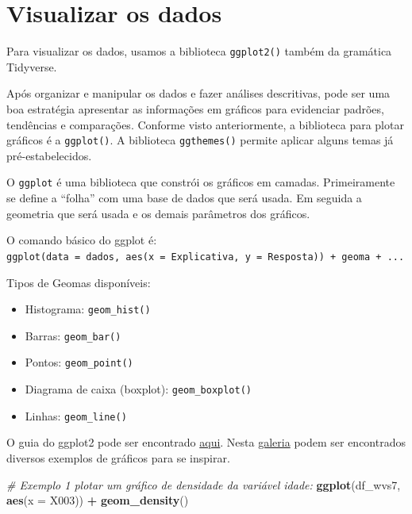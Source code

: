 \documentclass[
  brazil,
]{book}
\newenvironment{Shaded}{\begin{snugshade}}{\end{snugshade}}
\newcommand{\CommentTok}[1]{\textcolor[rgb]{0.56,0.35,0.01}{\textit{#1}}}
\newcommand{\DataTypeTok}[1]{\textcolor[rgb]{0.13,0.29,0.53}{#1}}
\newcommand{\KeywordTok}[1]{\textcolor[rgb]{0.13,0.29,0.53}{\textbf{#1}}}
\newcommand{\NormalTok}[1]{#1}
\newcommand{\OperatorTok}[1]{\textcolor[rgb]{0.81,0.36,0.00}{\textbf{#1}}}
\newcommand{\StringTok}[1]{\textcolor[rgb]{0.31,0.60,0.02}{#1}}
\providecommand{\tightlist}{%
  \setlength{\itemsep}{0pt}\setlength{\parskip}{0pt}}
\begin{document}
\hypertarget{visualizar-os-dados}{%
\chapter{Visualizar os dados}\label{visualizar-os-dados}}

Para visualizar os dados, usamos a biblioteca \texttt{ggplot2()} também da gramática Tidyverse.

Após organizar e manipular os dados e fazer análises descritivas, pode ser uma boa estratégia apresentar as informações em gráficos para evidenciar padrões, tendências e comparações. Conforme visto anteriormente, a biblioteca para plotar gráficos é a \texttt{ggplot()}. A biblioteca \texttt{ggthemes()} permite aplicar alguns temas já pré-estabelecidos.

O \texttt{ggplot} é uma biblioteca que constrói os gráficos em camadas. Primeiramente se define a ``folha'' com uma base de dados que será usada. Em seguida a geometria que será usada e os demais parâmetros dos gráficos.

O comando básico do ggplot é: \texttt{ggplot(data\ =\ dados,\ aes(x\ =\ Explicativa,\ y\ =\ Resposta))\ +\ geoma\ +\ ...}

Tipos de Geomas disponíveis:

\begin{itemize}
\tightlist
\item
  Histograma: \texttt{geom\_hist()}
\item
  Barras: \texttt{geom\_bar()}
\item
  Pontos: \texttt{geom\_point()}
\item
  Diagrama de caixa (boxplot): \texttt{geom\_boxplot()}
\item
  Linhas: \texttt{geom\_line()}
\end{itemize}

O guia do ggplot2 pode ser encontrado \href{https://ggplot2.tidyverse.org/index.html}{aqui}. Nesta \href{https://www.r-graph-gallery.com/}{galeria} podem ser encontrados diversos exemplos de gráficos para se inspirar.

\begin{Shaded}
\begin{Highlighting}[]
\CommentTok{# Exemplo 1 plotar um gráfico de densidade da variável idade: }
\KeywordTok{ggplot}\NormalTok{(df_wvs7, }\KeywordTok{aes}\NormalTok{(}\DataTypeTok{x =}\NormalTok{ X003)) }\OperatorTok{+}\StringTok{ }\KeywordTok{geom_density}\NormalTok{() }
\end{Highlighting}
\end{Shaded}
\end{document}
